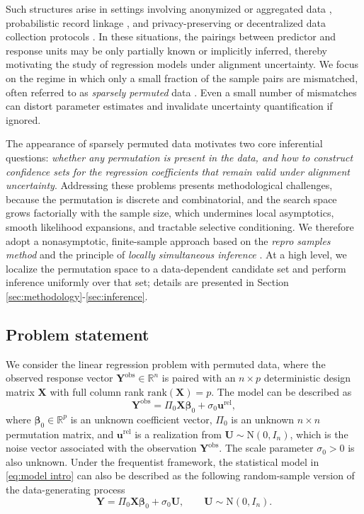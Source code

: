 \documentclass[11pt, reqno]{amsart}
\newcommand{\R}{\mathbb{R}}
\newcommand{\1}{\mbox{1}\hspace{-0.25em}\mbox{l}}
\newcommand{\obs}{\mathrm{obs}}
\newcommand{\rel}{\mathrm{rel}}
\newcommand{\rank}{\mathrm{rank}}
\newcommand{\Normal}{\mathrm{N}}
\theoremstyle{definition}\newtheorem{problem}{Problem}[section]
\theoremstyle{definition}\newtheorem{definition}[problem]{Definition}
\theoremstyle{remark}\newtheorem{assumption}{Assumption}
\theoremstyle{remark}\newtheorem{remark}[problem]{Remark}
\theoremstyle{definition}\newtheorem{example}[problem]{Example}
\theoremstyle{plain}\newtheorem{theorem}[problem]{Theorem}
\theoremstyle{plain}\newtheorem{question}[problem]{Question}
\theoremstyle{plain}\newtheorem{lemma}[problem]{Lemma}
\theoremstyle{plain}\newtheorem{proposition}[problem]{Proposition}
\theoremstyle{plain}\newtheorem{corollary}[problem]{Corollary}
\theoremstyle{plain}\newtheorem{conjecture}[problem]{Conjecture}
\begin{document}
Such structures arise in settings involving anonymized or aggregated data \citep{narayanan2008robust}, probabilistic record linkage \citep{fellegi1969theory, christen2012evaluation, winkler2014matching}, and privacy-preserving or decentralized data collection protocols \citep{vatsalan2017privacy, dwork2014algorithmic}.  
In these situations, the pairings between predictor and response units may be only partially known or implicitly inferred, thereby motivating the study of regression models under alignment uncertainty.
We focus on the regime in which only a small fraction of the sample pairs are mismatched, often referred to as \emph{sparsely permuted} data \citep{slawski2019linear}.  
Even a small number of mismatches can distort parameter estimates and invalidate uncertainty quantification if ignored.

The appearance of sparsely permuted data motivates two core inferential questions: \textit{whether any permutation is present in the data, and how to construct confidence sets for the regression coefficients that remain valid under alignment uncertainty}.
Addressing these problems presents methodological challenges, because the permutation is discrete and combinatorial, and the search space grows factorially with the sample size, which undermines local asymptotics, smooth likelihood expansions, and tractable selective conditioning. We therefore adopt a nonasymptotic, finite-sample approach based on the \emph{repro samples method} \citep{xie2022repro, xie2024repro, wang2022finite} and the principle of \emph{locally simultaneous inference} \citep{zrnic2024locally}. At a high level, we localize the permutation space to a data-dependent candidate set and perform inference uniformly over that set; details are presented in Section \ref{sec:methodology}-\ref{sec:inference}.


\subsection{Problem statement}
We consider the linear regression problem with permuted data, where the observed response vector $\bm{Y}^{\obs} \in \R^n$ is paired with an $n \times p$ deterministic design matrix $\bm{X}$ with full column rank $\rank(\bm{X})=p$. The model can be described as 
\begin{equation}\label{eq:model intro}
    \bm{Y}^{\obs}  = \Pi_0 \bm{X} \bm{\beta}_{0} + \sigma_0 \bm{u}^{\rel},
\end{equation}
where $\bm{\beta}_{0} \in \R^p$ is an unknown coefficient vector, $\Pi_0$ is an unknown $n \times n$ permutation matrix, and $\bm{u}^{\rel}$ is a realization from $\bm{U} \sim \Normal(0, I_n)$, which is the noise vector associated with the observation $\bm{Y}^{\obs}$. The scale parameter $\sigma_0 > 0$ is also unknown. Under the frequentist framework, the statistical model in \eqref{eq:model intro} can also be described as the following random-sample version of the data-generating process
\begin{equation}\label{eq:random}
    \bm{Y}  = \Pi_0 \bm{X} \bm{\beta}_{0} + \sigma_0 \bm{U}, \qquad \bm{U} \sim \Normal(0, I_n).
\end{equation}
\end{document}
